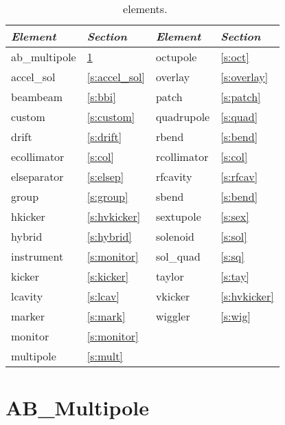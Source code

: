 \begin{table}[h]
\centering
{\tt
\begin{tabular}{|l|l||l|l|} \hline
  {\it Element} & {\it Section}     & {\it Element} & {\it Section}    \\ \hline
  ab\_multipole & \ref{s:ab_m}      &  octupole     & \ref{s:oct}      \\ \hline
  accel\_sol    & \ref{s:accel_sol} &  overlay      & \ref{s:overlay}  \\ \hline
  beambeam      & \ref{s:bbi}       &  patch        & \ref{s:patch}    \\ \hline
  custom        & \ref{s:custom}    &  quadrupole   & \ref{s:quad}     \\ \hline
  drift         & \ref{s:drift}     &  rbend        & \ref{s:bend}     \\ \hline
  ecollimator   & \ref{s:col}       &  rcollimator  & \ref{s:col}      \\ \hline
  elseparator   & \ref{s:elsep}     &  rfcavity     & \ref{s:rfcav}    \\ \hline
  group         & \ref{s:group}     &  sbend        & \ref{s:bend}     \\ \hline
  hkicker       & \ref{s:hvkicker}  &  sextupole    & \ref{s:sex}      \\ \hline
  hybrid        & \ref{s:hybrid}    &  solenoid     & \ref{s:sol}      \\ \hline
  instrument    & \ref{s:monitor}   &  sol\_quad    & \ref{s:sq}       \\ \hline
  kicker        & \ref{s:kicker}    &  taylor       & \ref{s:tay}      \\ \hline
  lcavity       & \ref{s:lcav}      &  vkicker      & \ref{s:hvkicker} \\ \hline
  marker        & \ref{s:mark}      &  wiggler      & \ref{s:wig}      \\ \hline
  monitor       & \ref{s:monitor}   &               &                  \\ \hline
  multipole     & \ref{s:mult}      &               &                  \\ \hline
\end{tabular}
}
\caption{\bmad\ elements.}
\label{tab:elements}\center
\end{table}

\vfil
\break

\section{AB\_Multipole}
\label{s:ab_m}

